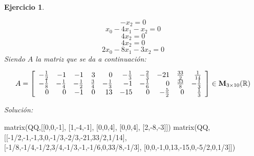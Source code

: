 \documentclass[12pt]{amsart}
\newtheorem{ejer}{Ejercicio}
\begin{document}
\begin{ejer}
\begin{minipage}{\textwidth}
\begin{tcolorbox}[colback = red!20!white,title=Versión Ecuaciones Implícitas]
\[ -x_{2} = 0 \]
\[ x_{0} - 4 x_{1} - x_{2} = 0 \]
\[ 4 x_{2} = 0 \]
\[ 4 x_{2} = 0 \]
\[ 2 x_{0} - 8 x_{1} - 3 x_{2} = 0 \]
Siendo $A$ la matriz que se da a continuación:
\end{tcolorbox}
\end{minipage}
\[ A = \left[\begin{array}{rrrrrrrrrr}
-\frac{1}{2} & -1 & -1 & 3 & 0 & -\frac{1}{3} & -\frac{2}{3} & -21 & \frac{33}{2} & \frac{1}{14} \\
-\frac{1}{8} & -\frac{1}{4} & -\frac{1}{2} & \frac{3}{4} & -\frac{1}{3} & -1 & -\frac{1}{6} & 0 & \frac{33}{8} & -\frac{1}{3} \\
0 & 0 & -1 & 0 & 13 & -15 & 0 & -\frac{5}{2} & 0 & \frac{1}{3}
\end{array}\right] \in {\bf M}_{3\times 10}({\mathbb R})\]
\end{ejer}

{\it Soluci\'on:}

\begin{sageblock}
matrix(QQ,[[0,0,-1],
[1,-4,-1],
[0,0,4],
[0,0,4],
[2,-8,-3]])
matrix(QQ,[[-1/2,-1,-1,3,0,-1/3,-2/3,-21,33/2,1/14],
[-1/8,-1/4,-1/2,3/4,-1/3,-1,-1/6,0,33/8,-1/3],
[0,0,-1,0,13,-15,0,-5/2,0,1/3]])
\end{sageblock}

\end{document}
